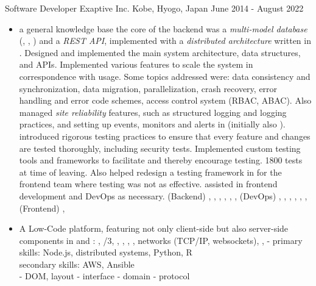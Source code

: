   \cventry
    {Software Developer} %
    {Exaptive Inc.} %
    {Kobe, Hyogo, Japan} %
    {June 2014 - August 2022} %
    {
      \begin{itemize} %
        \item { a general knowledge base
            the core of the backend was a {\it multi-model database} (\rfmongodb, \rfneofj, \rfelastic) and a {\it REST API}, implemented with a {\it distributed architecture} written in \rfnodejs. 
            Designed and implemented the main system architecture, data structures, and APIs. 
            Implemented various features to scale the system in correspondence with usage. 
            Some topics addressed were:
            data consistency and synchronization,
            data migration,
            parallelization,
            crash recovery,
            error handling and error code schemes,
            access control system (RBAC, ABAC).
            Also managed {\it site reliability} features, such as structured logging and logging practices, and setting up events, monitors and alerts in \rfnewrelic (initially also \rfsumologic).
           introduced rigorous testing practices to ensure that every feature and changes are tested thoroughly, including security tests. Implemented custom testing tools and frameworks to facilitate and thereby encourage testing. 1800 tests at time of leaving. 
          Also helped redesign a testing framework in \rfcypress for the frontend team where testing was not as effective.  
           assisted in frontend development and DevOps as necessary. 
          \tgskills (Backend) \rfnodejs, \rfmongodb, \rfneofj, \rfredis,  \rfbash, \rfdocker, 
          (DevOps) \rfaws, \rfterraform, \rfansible, \rfjenkins, \rfnewrelic, \rfsumologic,
          (Frontend) \rfreact, \rfcypress
        }
        \item { A Low-Code platform, featuring not only client-side but also server-side components in  and \rfrlang 
          : 
          \tgskills \rfjavascript, /3, \rfrlang, \rfmysql, \rfredis, \rfdocker, networks (TCP/IP, websockets), \rfaws, \rfansible
          - primary skills: Node.js, distributed systems, Python, R\\
            secondary skills: AWS, Ansible \\
          - DOM, layout
          - interface
          - domain 
          - protocol
        }
      \end{itemize}
    }


